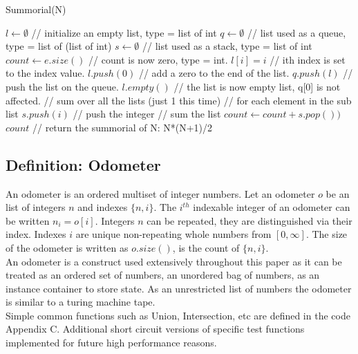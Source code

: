 \documentclass[10pt]{article}
\begin{document}
\begin{algorithm}
	\caption{Summorial(N)}\label{sum}
	\begin{algorithmic}[1]
		\State $l \gets \emptyset$ // initialize an empty list, type = list of int
		\State $q \gets \emptyset$ // list used as a queue, type = list of (list of int)
		\State $s \gets \emptyset$ // list used as a stack, type = list of int
		\State $count \gets e.size()$ // count is now zero, type = int.
		\State $l[i] = i$ // ith index is set to the index value.
		\EndFor
		\State $l.push(0)$  // add a zero to the end of the list.
		\State $q.push(l)$ // push the list on the queue.
		\State $l.empty()$ // the list is now empty list, q[0] is not affected.
		 // sum over all the lists (just 1 this time)
		  // for each element in the sub list
		\State $s.push(i)$ // push the integer
		\EndFor
		\EndWhile
		  // sum the list
		\State $count \gets count + s.pop())$ 
		\EndWhile
		\State \Return $count$ // return the summorial of N:  N*(N+1)/2
		\EndFunction
	\end{algorithmic}
\end{algorithm}

\subsection{Definition: Odometer ~\cite{Odometer:Fuchs}}

An odometer is an ordered multiset of integer numbers. Let an odometer $o$ be an list of integers $n$ and indexes $\{n,i\}$. The $i^{th}$ indexable integer of an odometer can be written $n_i = o[i]$. Integers $n$ can be repeated, they are distinguished via their index. Indexes $i$ are unique non-repeating whole numbers from $[0,\infty]$. The size of the odometer is written as $o.size()$, is the count of $\{n,i\}$. \\

An odometer is a construct used extensively throughout this paper as it can be treated as an ordered set of numbers, an unordered bag of numbers, as an instance container to store state. As an unrestricted list of numbers the odometer is similar to a turing machine tape. \\

Simple common functions such as Union, Intersection, etc are defined in the code Appendix C. Additional short circuit versions of specific test functions implemented for future high performance reasons. \\
\end{document}
